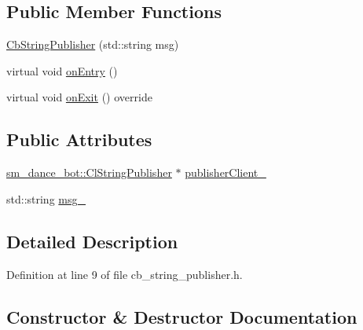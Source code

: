 \subsection*{Public Member Functions}
\begin{DoxyCompactItemize}
\item 
\hyperlink{classsm__dance__bot_1_1CbStringPublisher_ac08fd30f96c32387d6c0ad6130b1ea4d}{Cb\+String\+Publisher} (std\+::string msg)
\item 
virtual void \hyperlink{classsm__dance__bot_1_1CbStringPublisher_af1f114aba3bb34d40f4e3b3fb00809e9}{on\+Entry} ()
\item 
virtual void \hyperlink{classsm__dance__bot_1_1CbStringPublisher_a487d8302e60f01401a7d189382ba5f73}{on\+Exit} () override
\end{DoxyCompactItemize}
\subsection*{Public Attributes}
\begin{DoxyCompactItemize}
\item 
\hyperlink{classsm__dance__bot_1_1ClStringPublisher}{sm\+\_\+dance\+\_\+bot\+::\+Cl\+String\+Publisher} $\ast$ \hyperlink{classsm__dance__bot_1_1CbStringPublisher_a3444c52fae1bd6d7da8c16c894050b2b}{publisher\+Client\+\_\+}
\item 
std\+::string \hyperlink{classsm__dance__bot_1_1CbStringPublisher_a57ebf1bedad677d9a4b40b8df271a904}{msg\+\_\+}
\end{DoxyCompactItemize}


\subsection{Detailed Description}


Definition at line 9 of file cb\+\_\+string\+\_\+publisher.\+h.



\subsection{Constructor \& Destructor Documentation}
